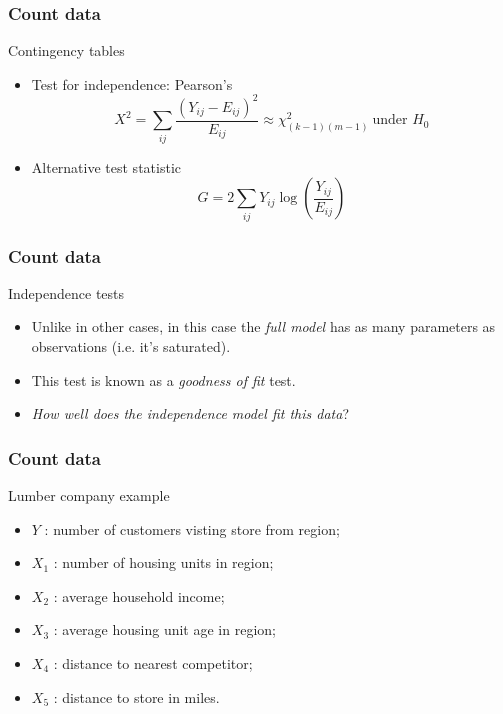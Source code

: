 \documentclass[handout]{beamer}
\begin{document}
   \begin{frame} \frametitle{Count data}

   \begin{block}
       {Contingency tables}
       \begin{itemize}
    \item Test for independence: Pearson's
   $$
   X^2 = \sum_{ij} \frac{(Y_{ij}-E_{ij})^2}{E_{ij}} \approx \chi^2_{(k-1)(m-1)} \  \text{under $H_0$}$$


       \item Alternative test statistic
   $$
   G = 2\sum_{ij} Y_{ij} \log \left(\frac{Y_{ij}}{E_{ij}}\right)$$
       \end{itemize}
   \end{block}
   \end{frame}


   \begin{frame} \frametitle{Count data}

   \begin{block}
       {Independence tests}
       \begin{itemize}[<+->]
       \item Unlike in other cases, in this case the {\em full model}
       has as many parameters as observations (i.e. it's saturated).

       \item This test is known as a {\em goodness of fit} test.
       \item {\em How well does the independence model fit this data}?
       \end{itemize}
   \end{block}
   \end{frame}


   \begin{frame} \frametitle{Count data}

   \begin{block}
       {Lumber company example}
       \begin{itemize}
       \item $Y$ : number of customers visting store from region;

    \item $X_1$ : number of housing units in region;

    \item $X_2$ : average household income;

    \item $X_3$ : average housing unit age in region;

    \item $X_4$ : distance to nearest competitor;

    \item $X_5$ : distance to store in miles.

       \end{itemize}
   \end{block}
   \end{frame}
\end{document}
